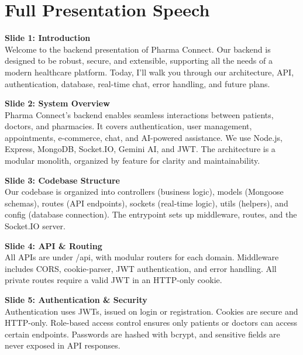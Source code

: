 \documentclass[12pt]{article}
\begin{document}
\newpage


\section*{Full Presentation Speech}

\textbf{Slide 1: Introduction}\\
Welcome to the backend presentation of Pharma Connect. Our backend is designed to be robust, secure, and extensible, supporting all the needs of a modern healthcare platform. Today, I'll walk you through our architecture, API, authentication, database, real-time chat, error handling, and future plans.

\vspace{0.3cm}
\textbf{Slide 2: System Overview}\\
Pharma Connect's backend enables seamless interactions between patients, doctors, and pharmacies. It covers authentication, user management, appointments, e-commerce, chat, and AI-powered assistance. We use Node.js, Express, MongoDB, Socket.IO, Gemini AI, and JWT. The architecture is a modular monolith, organized by feature for clarity and maintainability.

\vspace{0.3cm}
\textbf{Slide 3: Codebase Structure}\\
Our codebase is organized into controllers (business logic), models (Mongoose schemas), routes (API endpoints), sockets (real-time logic), utils (helpers), and config (database connection). The entrypoint sets up middleware, routes, and the Socket.IO server.

\vspace{0.3cm}
\textbf{Slide 4: API \& Routing}\\
All APIs are under /api, with modular routers for each domain. Middleware includes CORS, cookie-parser, JWT authentication, and error handling. All private routes require a valid JWT in an HTTP-only cookie.

\vspace{0.3cm}
\textbf{Slide 5: Authentication \& Security}\\
Authentication uses JWTs, issued on login or registration. Cookies are secure and HTTP-only. Role-based access control ensures only patients or doctors can access certain endpoints. Passwords are hashed with bcrypt, and sensitive fields are never exposed in API responses.
\end{document}
